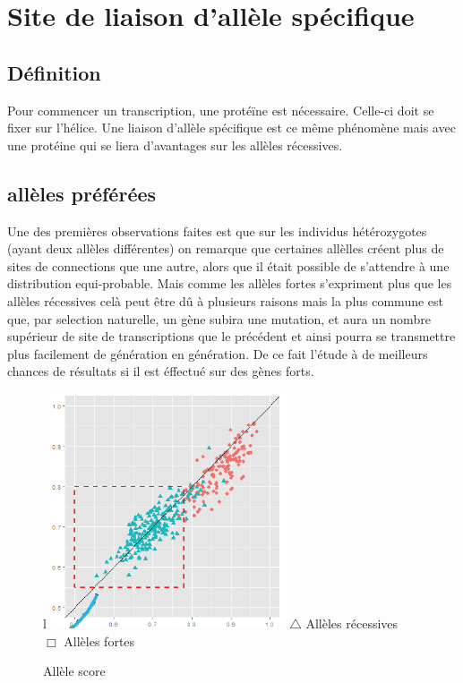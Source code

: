 \section{Site de liaison d'allèle spécifique}

\subsection{Définition}
Pour commencer un transcription, une protéïne est nécessaire. Celle-ci doit se fixer sur l'hélice. Une liaison d'allèle spécifique est ce même phénomène mais avec une protéine qui se liera d'avantages sur les allèles récessives.

\subsection{allèles préférées}

Une des premières observations faites est que sur les individus hétérozygotes (ayant deux allèles différentes) on remarque que certaines allèlles créent plus de sites de connections que une autre, alors que il était possible de s'attendre à une distribution equi-probable. 
\newline
\newline
Mais comme les allèles fortes s'expriment plus que les allèles récessives celà peut être dû à plusieurs raisons mais la plus commune est que, par selection naturelle, un gène subira une mutation, et aura un nombre supérieur de site de transcriptions que le précédent et ainsi pourra se transmettre plus facilement de génération en génération. De ce fait l'étude à de meilleurs chances de résultats si il est éffectué sur des gènes forts.
\begin{figure}{l}{}
\centering
\includegraphics{grapheBestAllele}
\newline
\color{blue}
$\triangle$
\color{black} Allèles récessives
\\
\color{red}
$\Box$
\color{black} Allèles fortes
\caption{Allèle score}
\end{figure}


